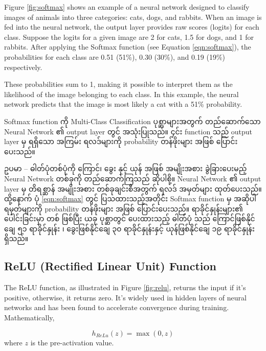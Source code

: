 Figure \ref{fig:softmax} shows an example of a neural network designed to classify images of animals into three categories: cats, dogs, and rabbits. When an image is fed into the neural network, the output layer provides raw scores (logits) for each class. Suppose the logits for a given image are 2 for cats, 1.5 for dogs, and 1 for rabbits. After applying the Softmax function (see Equation \ref{eqn:softmax}), the probabilities for each class are 0.51 (51\%), 0.30 (30\%), and 0.19 (19\%) respectively.

These probabilities sum to 1, making it possible to interpret them as the likelihood of the image belonging to each class. In this example, the neural network predicts that the image is most likely a cat with a 51\% probability.

\vspace{0.5em} 
\noindent Softmax function ကို Multi-Class Classification ပုစ္ဆာများအတွက် တည်ဆောက်သော Neural Network ၏ output layer တွင် အသုံးပြုသည်။ ၄င်း function သည် output layer မှ ရရှိသော အကြမ်း ရလဒ်များကို probability တန်ဖိုးများ အဖြစ် ပြောင်းပေးသည်။ 

ဥပမာ -- ဓါတ်ပုံတစ်ပုံကို ကြောင်၊ ခွေး နှင့် ယုန် အဖြစ် အမျိုးအစား ခွဲခြားပေးမည့် Neural Network တစ်ခုကို တည်ဆောက်ကြသည် ဆိုပါစို့။ Neural Network ၏ output layer မှ  တိရစ္ဆာန် အမျိုးအစား တစ်ခုချင်းစီအတွက် ရလဒ် အမှတ်များ ထုတ်ပေးသည်။ ထို့နောက် ပုံ \ref{eqn:softmax} တွင် ပြသထားသည့်အတိုင်း Softmax function မှ အဆိုပါ ရမှတ်များကို  probability တန်ဖိုးများ အဖြစ် ပြောင်းပေးသည်။ ရာခိုင်နှုန်းများ၏ ပေါင်းခြင်းမှာ တစ် ဖြစ်ပြီး ယခု ပုစ္ဆာတွင် ပေးထားသည့် ဓါတ်ပုံ သည် ကြောင်ဖြစ်နိုင်ချေ ၅၁ ရာခိုင်နှုန်း ၊ ခွေးဖြစ်နိုင်ချေ ၃၀ ရာခိုင်နှုန်းနှင့် ယုန်ဖြစ်နိုင်ချေ ၁၉ ရာခိုင်နှုန်း ရှိသည်။ 


\subsection{ReLU (Rectified Linear Unit) Function}
The ReLU function, as illustrated in Figure \ref{fig:relu}, returns the input if it's positive, otherwise, it returns zero. It's widely used in hidden layers of neural networks and has been found to accelerate convergence during training. Mathematically, 

\begin{equation}\label{eqn:relu}
    h_{ReLu}(z) = \max(0, z)
\end{equation} where $z$ is the pre-activation value. 

